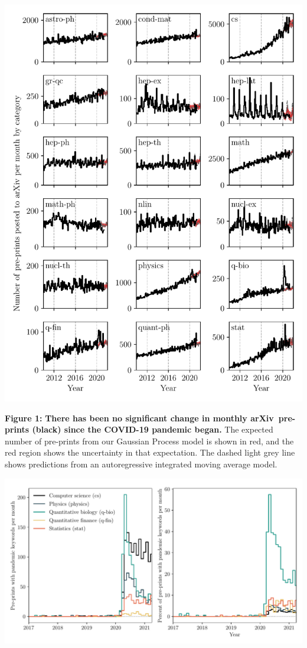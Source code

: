 \documentclass[a4paper,12pt]{article}
\newcommand{\arxiv}{arXiv}
\begin{document}
\begin{center}
\includegraphics[width=0.95\linewidth]{Casey_Figure_1} %
\end{center}

\noindent \textbf{Figure 1:} \textbf{There has been no significant change in monthly \arxiv\ pre-prints (black) since the COVID-19 pandemic began.} The expected number of pre-prints from our Gaussian Process model is shown in red, and the red region shows the uncertainty in that expectation. The dashed light grey line shows predictions from an autoregressive integrated moving average model.

\newpage

\begin{center}
 \includegraphics[width=\linewidth]{Casey_Figure_2} %
\end{center}
\end{document}
